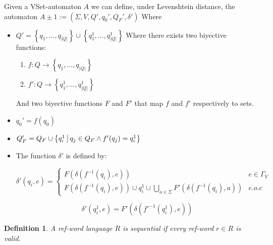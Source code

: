 \documentclass{article}
\newcommand{\abs}[1]{\left|#1\right|}
\newcommand{\set}[1]{\left\{#1\right\}}
\newcommand{\st}{\ \vline \ }
\newcommand{\ra}{\rightarrow}
\newtheorem{definition}{Definition}
\begin{document}
Given a VSet-automaton $A$ we can define, under Levenshtein distance,
the automaton $A \pm 1:= (\Sigma, V, Q', q_0', Q_F', \delta')$ Where
\begin{itemize}
    \item $Q' = \set{q_1,...,q_{\abs{Q}}} \cup \set{q^{1}_1, ...,
    q^{1}_{\abs{Q}}} $ Where there exists two biyective functions:

        \begin{enumerate}
            \item $f: Q \ra \set{q_1,...,q_{\abs{Q}}}$ 
            \item $f' : Q \ra \set{q^{1}_1, ..., q^{1}_{\abs{Q}}}$
        \end{enumerate}

	And two biyective functions $F$ and $F'$ that map $f$ and
	$f'$ respectively to sets.

    \item $q_0' = f(q_0)$

    \item $Q_F' = Q_F \cup \set{q^1_i \st q_j \in Q_F \land f'(q_j) = q_i^1}$
    \item The function $\delta'$ is defined by:

        \begin{equation*}
        \delta'(q_i, e) = 
            \begin{cases}

            F(\delta(f^{-1}(q_i), e)) & e \in \Gamma_V\\
                    F(\delta(f^{-1}(q_i), e)) \cup q_i^1\cup
                    \underset{a \in \Sigma}{\bigcup}
                    F'(\delta(f^{-1}(q_i), a)) & e.o.c

            \end{cases}
        \end{equation*}

        \begin{equation*}
            \delta'(q_i^1, e) = F'(\delta(f'^{-1}(q_i^1), e))
        \end{equation*}

\end{itemize}
\begin{definition}\label{defSequential}
    A ref-word language $R$ is sequential if every ref-word $r \in
    R$ is valid.
\end{definition}
\end{document}
